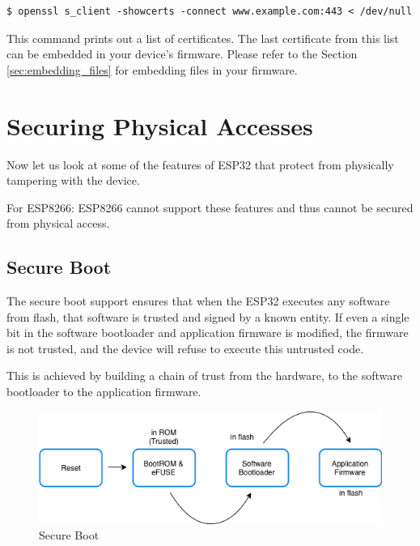 \documentclass[main.tex]{subfiles}
\begin{document}
\begin{verbatim}
$ openssl s_client -showcerts -connect www.example.com:443 < /dev/null
\end{verbatim}

This command prints out a list of certificates. The last certificate from this list can be embedded in your device's firmware. Please refer to the Section \ref{sec:embedding_files} for embedding files in your firmware.

\section{Securing Physical Accesses}
Now let us look at some of the features of ESP32 that protect from physically tampering with the device.

For ESP8266:
ESP8266 cannot support these features and thus cannot be secured from physical access.

\subsection{Secure Boot}
The secure boot support ensures that when the ESP32 executes any software from flash, that software is trusted and signed by a known entity. If even a single bit in the software bootloader and application firmware is modified, the firmware is not trusted, and the device will refuse to execute this untrusted code.

This is achieved by building a chain of trust from the hardware, to the software bootloader to the application firmware.

\begin{figure}[h!]
    \centering
    \includegraphics[scale=0.5]{../../_static/secure_boot.png}
    \caption{Secure Boot}
    \label{fig:sec_boot}
\end{figure}
\end{document}
